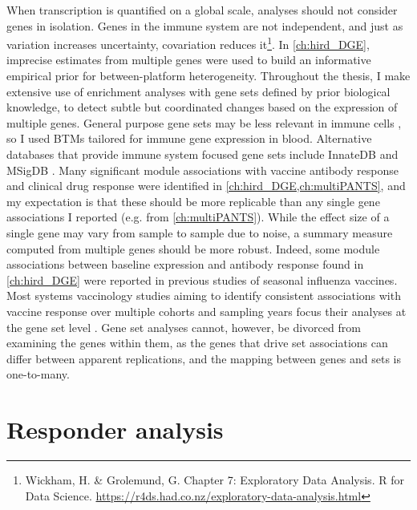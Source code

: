 When transcription is quantified on a global scale, analyses should not consider genes in isolation.
Genes in the immune system are not independent, and just as variation increases uncertainty, covariation reduces it\footnote{Wickham, H. \& Grolemund, G. Chapter 7: Exploratory Data Analysis. R for Data Science. \url{https://r4ds.had.co.nz/exploratory-data-analysis.html}}.
In \cref{ch:hird_DGE}, imprecise estimates from multiple genes were used to build an informative empirical prior for between-platform heterogeneity.
Throughout the thesis, I make extensive use of enrichment analyses with gene sets defined by prior biological knowledge,
to detect subtle but coordinated changes based on the expression of multiple genes.
General purpose gene sets may be less relevant in immune cells \autocite{nakaya2015SystemsAnalysisImmunity}, 
so I used \glspl{BTM} \autocite{chaussabel2008ModularAnalysisFramework,li2013MolecularSignaturesAntibody} tailored for immune gene expression in blood.
Alternative databases that provide immune system focused gene sets include InnateDB \autocite{breuer2013InnateDBSystemsBiology} and MSigDB \autocite{liberzon2011MolecularSignaturesDatabase}.
Many significant module associations with vaccine antibody response and clinical drug response were identified in \cref{ch:hird_DGE,ch:multiPANTS},
and my expectation is that these should be more replicable than any single gene associations I reported (e.g.  from \cref{ch:multiPANTS}).
While the effect size of a single gene may vary from sample to sample due to noise, 
a summary measure computed from multiple genes should be more robust.
Indeed, some module associations between baseline expression and antibody response found in \cref{ch:hird_DGE} were reported in previous studies of seasonal influenza vaccines.
Most systems vaccinology studies aiming to identify consistent associations with vaccine response over multiple cohorts and sampling years focus their analyses at the gene set level \autocite{tsang2020ImprovingVaccineinducedImmunity}.
Gene set analyses cannot, however, be divorced from examining the genes within them,
as the genes that drive set associations can differ between apparent replications,
and the mapping between genes and sets is one-to-many.

\section{Responder analysis}
\label{sec:discussion_responderAnalysis}

